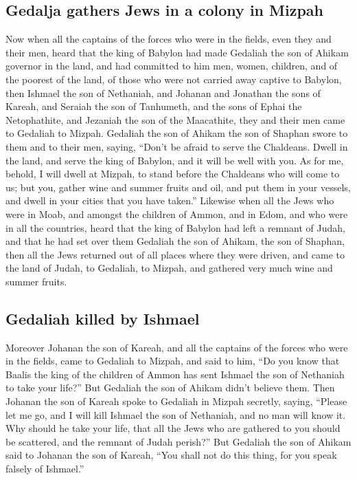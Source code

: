 \hypertarget{gedalja-gathers-jews-in-a-colony-in-mizpah}{%
\subsection{Gedalja gathers Jews in a colony in
Mizpah}\label{gedalja-gathers-jews-in-a-colony-in-mizpah}}

 Now when all the captains of the forces who were in the
fields, even they and their men, heard that the king of Babylon had made
Gedaliah the son of Ahikam governor in the land, and had committed to
him men, women, children, and of the poorest of the land, of those who
were not carried away captive to Babylon,  then Ishmael
the son of Nethaniah, and Johanan and Jonathan the sons of Kareah, and
Seraiah the son of Tanhumeth, and the sons of Ephai the Netophathite,
and Jezaniah the son of the Maacathite, they and their men came to
Gedaliah to Mizpah.  Gedaliah the son of Ahikam the son of
Shaphan swore to them and to their men, saying, ``Don't be afraid to
serve the Chaldeans. Dwell in the land, and serve the king of Babylon,
and it will be well with you.  As for me, behold, I will
dwell at Mizpah, to stand before the Chaldeans who will come to us; but
you, gather wine and summer fruits and oil, and put them in your
vessels, and dwell in your cities that you have taken.'' 
Likewise when all the Jews who were in Moab, and amongst the children of
Ammon, and in Edom, and who were in all the countries, heard that the
king of Babylon had left a remnant of Judah, and that he had set over
them Gedaliah the son of Ahikam, the son of Shaphan, 
then all the Jews returned out of all places where they were driven, and
came to the land of Judah, to Gedaliah, to Mizpah, and gathered very
much wine and summer fruits.

\hypertarget{gedaliah-killed-by-ishmael}{%
\subsection{Gedaliah killed by
Ishmael}\label{gedaliah-killed-by-ishmael}}

 Moreover Johanan the son of Kareah, and all the captains
of the forces who were in the fields, came to Gedaliah to Mizpah,
 and said to him, ``Do you know that Baalis the king of
the children of Ammon has sent Ishmael the son of Nethaniah to take your
life?'' But Gedaliah the son of Ahikam didn't believe them.
 Then Johanan the son of Kareah spoke to Gedaliah in
Mizpah secretly, saying, ``Please let me go, and I will kill Ishmael the
son of Nethaniah, and no man will know it. Why should he take your life,
that all the Jews who are gathered to you should be scattered, and the
remnant of Judah perish?''  But Gedaliah the son of
Ahikam said to Johanan the son of Kareah, ``You shall not do this thing,
for you speak falsely of Ishmael.''

